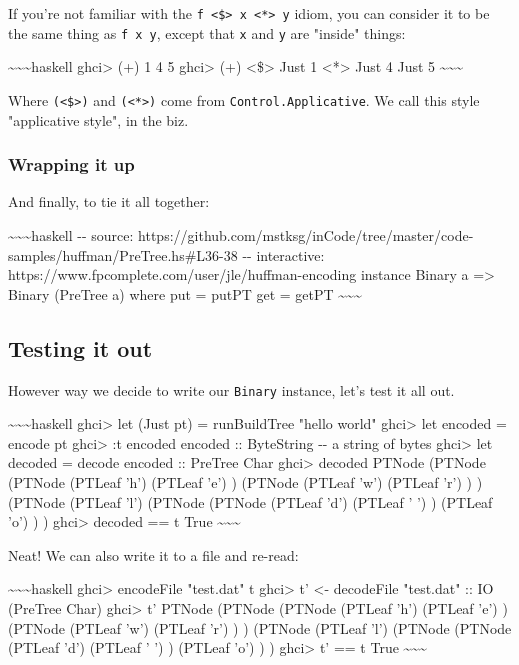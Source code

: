\documentclass[]{article}
\begin{document}
If you're not familiar with the
\texttt{f\ \textless{}\$\textgreater{}\ x\ \textless{}*\textgreater{}\ y} idiom,
you can consider it to be the same thing as \texttt{f\ x\ y}, except that
\texttt{x} and \texttt{y} are "inside" things:

\textasciitilde{}\textasciitilde{}\textasciitilde{}haskell ghci\textgreater{}
(+) 1 4 5 ghci\textgreater{} (+) \textless{}\$\textgreater{} Just 1
\textless{}*\textgreater{} Just 4 Just 5
\textasciitilde{}\textasciitilde{}\textasciitilde{}

Where \texttt{(\textless{}\$\textgreater{})} and
\texttt{(\textless{}*\textgreater{})} come from \texttt{Control.Applicative}. We
call this style "applicative style", in the biz.

\subsubsection{Wrapping it up}

And finally, to tie it all together:

\textasciitilde{}\textasciitilde{}\textasciitilde{}haskell -\/- source:
https://github.com/mstksg/inCode/tree/master/code-samples/huffman/PreTree.hs\#L36-38
-\/- interactive: https://www.fpcomplete.com/user/jle/huffman-encoding instance
Binary a =\textgreater{} Binary (PreTree a) where put = putPT get = getPT
\textasciitilde{}\textasciitilde{}\textasciitilde{}

\subsection{Testing it out}

However way we decide to write our \texttt{Binary} instance, let's test it all
out.

\textasciitilde{}\textasciitilde{}\textasciitilde{}haskell ghci\textgreater{}
let (Just pt) = runBuildTree "hello world" ghci\textgreater{} let encoded =
encode pt ghci\textgreater{} :t encoded encoded :: ByteString -\/- a string of
bytes ghci\textgreater{} let decoded = decode encoded :: PreTree Char
ghci\textgreater{} decoded PTNode (PTNode (PTNode (PTLeaf 'h') (PTLeaf 'e') )
(PTNode (PTLeaf 'w') (PTLeaf 'r') ) ) (PTNode (PTLeaf 'l') (PTNode (PTNode
(PTLeaf 'd') (PTLeaf ' ') ) (PTLeaf 'o') ) ) ghci\textgreater{} decoded == t
True \textasciitilde{}\textasciitilde{}\textasciitilde{}

Neat! We can also write it to a file and re-read:

\textasciitilde{}\textasciitilde{}\textasciitilde{}haskell ghci\textgreater{}
encodeFile "test.dat" t ghci\textgreater{} t' \textless{}- decodeFile "test.dat"
:: IO (PreTree Char) ghci\textgreater{} t' PTNode (PTNode (PTNode (PTLeaf 'h')
(PTLeaf 'e') ) (PTNode (PTLeaf 'w') (PTLeaf 'r') ) ) (PTNode (PTLeaf 'l')
(PTNode (PTNode (PTLeaf 'd') (PTLeaf ' ') ) (PTLeaf 'o') ) ) ghci\textgreater{}
t' == t True \textasciitilde{}\textasciitilde{}\textasciitilde{}
\end{document}
